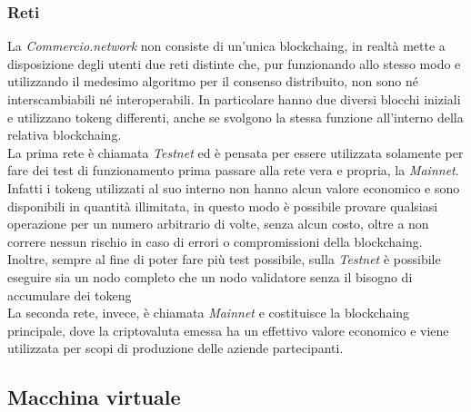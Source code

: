 \subsubsection*{Reti}

La \textit{Commercio.network} non consiste di un'unica \gls{blockchaing}, in realtà mette a disposizione degli utenti due reti distinte che, pur funzionando allo stesso modo e utilizzando il medesimo algoritmo per il consenso distribuito, non sono né interscambiabili né interoperabili. In particolare hanno due diversi blocchi iniziali e utilizzano \gls{tokeng} differenti, anche se svolgono la stessa funzione all'interno della relativa \gls{blockchaing}.\\
La prima rete è chiamata \textit{Testnet} ed è pensata per essere utilizzata solamente per fare dei test di funzionamento prima passare alla rete vera e propria, la \textit{Mainnet}. Infatti i \gls{tokeng} utilizzati al suo interno non hanno alcun valore economico e sono disponibili in quantità illimitata, in questo modo è possibile provare qualsiasi operazione per un numero arbitrario di volte, senza alcun costo, oltre a non correre nessun rischio in caso di errori o compromissioni della \gls{blockchaing}. Inoltre, sempre al fine di poter fare più test possibile, sulla \textit{Testnet} è possibile eseguire sia un nodo completo che un nodo validatore senza il bisogno di accumulare dei \gls{tokeng}\\
La seconda rete, invece, è chiamata \textit{Mainnet} e costituisce la \gls{blockchaing} principale, dove la criptovaluta emessa ha un effettivo valore economico e viene utilizzata per scopi di produzione delle aziende partecipanti.

\subsection{Macchina virtuale}


